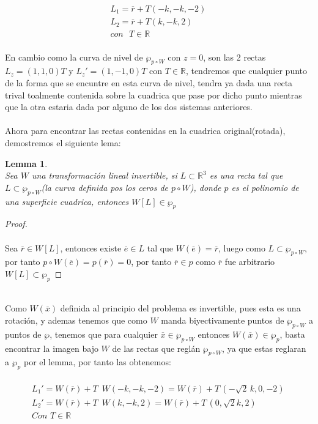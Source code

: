 \documentclass[11pt,letterpaper]{article}
\newtheorem{lemma}[theorem]{Lemma}
\newcommand{\R}{\mathbb{R}}
\begin{document}
        \begin{align*}
            L_1=\overline{r}+T(-k,-k,-2)\,\\
            L_2=\overline{r}+T(k,-k,2)\,\\
            con\,\,\,\,T\in \R
        \end{align*}\,\\
        En cambio como la curva de nivel de $\wp_{p\circ W}$ con $z=0$, son las 2 rectas $L_z=(1,1,0)T$ y $L_{z}'=(1,-1,0)T$ con $T\in \R$, tendremos que cualquier punto
        de la forma que se encuntre en esta curva de nivel, tendra ya dada una recta trival toalmente contenida sobre la cuadrica que pase por dicho punto
        mientras que la otra estaria dada por alguno de los dos sistemas anteriores.\,\\
        \,\\
        Ahora para encontrar las rectas contenidas en la cuadrica original(rotada), demostremos el siguiente lema:\,\\
        \begin{lemma}\,\\
            Sea $W$ una transformaci\'on lineal invertible, si $L\subset \R^3$ es una recta tal que $L\subset \wp_{p\circ W}$(la curva definida pos los ceros de $p\circ W$), donde $p$ es el polinomio de una superficie cuadrica, entonces $W[L]\in \wp_{p}$ 
        \end{lemma}
        \begin{proof}\,\\
            \,\\
            Sea $\overline{r}\in W[L]$, entonces existe $\overline{e}\in L$ tal que $W(\overline{e})=\overline{r}$, luego como $L\subset\wp_{ p\circ W}$, por tanto $p\circ W(\overline{e})=p(\overline{r})=0$, por tanto
            $\overline{r}\in p$ como $\overline r$ fue arbitrario $W[L]\subset \wp_{p}$
        \end{proof}\,\\
        Como $W(\overline{x})$ definida al principio del problema es invertible, pues esta es una rotaci\'on, y ademas tenemos que como $W$ manda biyectivamente puntos de $\wp_{p\circ W}$ a puntos de $\wp$, tenemos que para cualquier $\overline{x}\in \wp_{p\circ W}$ entonces
        $W(\overline{x})\in \wp_{p}$, basta encontrar la imagen bajo $W$ de las rectas que regl\'an $\wp_{p\circ W}$, ya que estas reglaran a $\wp_{p}$ por el lemma, por tanto las obtenemos:\,\\
        \,\\
        \begin{align*}
            L_1'=W(\overline{r})+T\,\,\,W(-k,-k,-2)=W(\overline{r})+T\,(-\sqrt{2}\,k,0,-2)\,\\
            L_2'=W(\overline{r})+T\,\,\,W(k,-k,2)=W(\overline{r})+T\,(0,\sqrt{2}k,2)\,\\
            Con\,\,T\in \R
        \end{align*}\,\\
\end{document}
